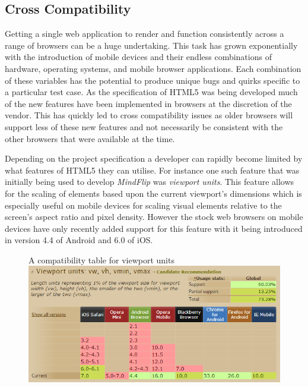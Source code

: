 \documentclass[final]{cmpreport}
\begin{document}
\subsection{Cross Compatibility}
Getting a single web application to render and function consistently across a range of browsers can be a huge undertaking. This task has grown exponentially with the introduction of mobile devices and their endless combinations of hardware, operating systems, and mobile browser applications. Each combination of these variables has the potential to produce unique bugs and quirks specific to a particular test case. As the specification of HTML5 was being developed much of the new features have been implemented in browsers at the discretion of the vendor. This has quickly led to cross compatibility issues as older browsers will support less of these new features and not necessarily be consistent with the other browsers that were available at the time.

Depending on the project specification a developer can rapidly become limited by what features of HTML5 they can utilise. For instance one such feature that was initially being used to develop \textit{MindFlip} was \textit{viewport units}. This feature allows for the scaling of elements based upon the current viewport's dimensions which is especially useful on mobile devices for scaling visual elements relative to the screen's aspect ratio and pixel density. However the stock web browsers on mobile devices have only recently added support for this feature with it being introduced in version 4.4 of Android and 6.0 of iOS.

\begin{figure}[h]{A compatibility table for viewport units \label{viewport}}
  \includegraphics[width=1.0\textwidth]{viewport-units.png}
\end{figure}
\end{document}
